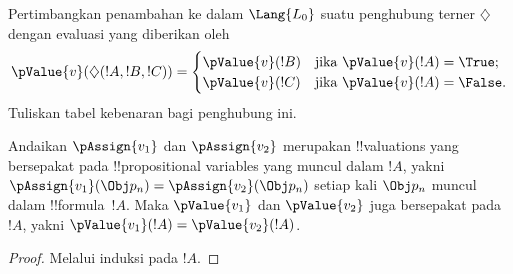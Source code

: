 \documentclass[../../../include/open-logic-section]{subfiles}
\begin{document}
\begin{prob}
Pertimbangkan penambahan ke dalam $\Lang{L_0}$ suatu penghubung terner
$\diamondsuit$ dengan evaluasi yang diberikan oleh
\begin{gather*}
  \pValue{v}(\diamondsuit( !A , !B , !C ) ) = \begin{cases}
    \pValue{v}( !B ) &
    \text{jika $\pValue{v}(!A) = \True$;}\\
    \pValue{v}( !C ) &
    \text{jika $\pValue{v}(!A) = \False $}.
  \end{cases}
\end{gather*}
Tuliskan tabel kebenaran bagi penghubung ini.
\end{prob}

\begin{thm}
 Andaikan $\pAssign{v_1}$ dan
$\pAssign{v_2}$ merupakan !!{valuation}s yang bersepakat pada
!!{propositional
variable}s yang muncul dalam $!A$, yakni
$\pAssign{v_1}(\Obj p_n) = \pAssign{v_2}(\Obj p_n)$ setiap kali $\Obj p_n$
muncul dalam !!{formula}~$!A$. Maka $\pValue{v_1}$ dan $\pValue{v_2}$ juga
bersepakat pada~$!A$, yakni $\pValue{v_1}(!A) = \pValue{v_2}(!A)$.
\end{thm}

\begin{proof}
Melalui induksi pada $!A$.
\end{proof}
\end{document}
